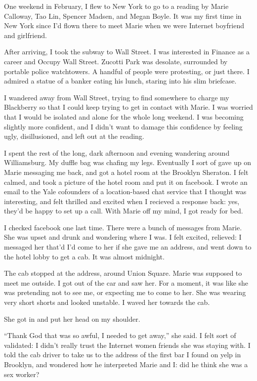 \documentclass[12pt]{memoir}
\begin{document}
 One weekend in February, I flew to New York to go to a reading by Marie
Calloway, Tao Lin, Spencer Madsen, and Megan Boyle.  It was my first time in
New York since I'd flown there to meet Marie when we were Internet boyfriend
and girlfriend.  

After arriving, I took the subway to Wall Street.  I was interested in Finance
as a career and Occupy Wall Street.  Zucotti Park was desolate, surrounded by
portable police watchtowers. A handful of people were protesting, or just there.
I admired a statue of a banker eating his lunch, staring into his slim
briefcase.

I wandered away from Wall Street, trying to find somewhere to charge my
Blackberry  so that I could keep trying to get in contact with Marie. I was
worried that I would be isolated and alone for the whole long weekend.  I was
becoming slightly more confident, and I didn't want to damage this confidence by
feeling ugly, disillusioned, and left out at the reading.

I spent the rest of the long, dark afternoon and evening wandering around
Williamsburg.  My duffle bag was chafing my legs.  Eventually I sort of gave up
on Marie messaging me back, and got a hotel room at the Brooklyn Sheraton.  I
felt calmed, and took a picture of the hotel room and put it on facebook.  I
wrote an email to the Yale cofounders of a location-based chat service that I
thought was interesting, and felt thrilled and excited when I recieved a
response back: yes, they'd be happy to set up a call.  With Marie off my mind, I
got ready for bed.  

I checked facebook one last time.  There were a bunch of messages from Marie.
She was upset and drunk and wondering where I was.  I felt excited, relieved: I
messaged her that'd I'd come to her if she gave me an address, and went down to
the hotel lobby to get a cab.  It was almost midnight.

The cab stopped at the address, around Union Square.  Marie was supposed to meet
me outside.  I got out of the car and saw her.  For a moment, it was like she
was pretending not to see me, or expecting me to come to her.  She was wearing
very short shorts and looked unstable.  I waved her towards the cab.  

She got in and put her head on my shoulder.

``Thank God that was so awful, I needed to get away,'' she said.  I felt sort of
validated: I didn't really trust the Internet women friends she was staying
with.  I told the cab driver to take us to the address of the first bar I found
on yelp in Brooklyn, and wondered how he interpreted Marie and I: did he think
she was a sex worker?  
\end{document}
